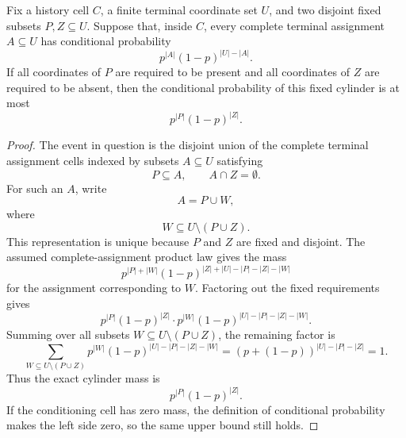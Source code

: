 \begin{helper}
Fix a history cell \(C\), a finite terminal coordinate set \(U\), and two
disjoint fixed subsets \(P,Z\subseteq U\).  Suppose that, inside \(C\), every
complete terminal assignment \(A\subseteq U\) has conditional probability
\[
p^{|A|}(1-p)^{|U|-|A|}.
\]
If all coordinates of \(P\) are required to be present and all coordinates of
\(Z\) are required to be absent, then the conditional probability of this
fixed cylinder is at most
\[
p^{|P|}(1-p)^{|Z|}.
\]
\end{helper}
\begin{proof}
The event in question is the disjoint union of the complete terminal
assignment cells indexed by subsets \(A\subseteq U\) satisfying
\[
P\subseteq A,\qquad A\cap Z=\emptyset.
\]
For such an \(A\), write
\[
A=P\cup W,
\]
where
\[
W\subseteq U\setminus(P\cup Z).
\]
This representation is unique because \(P\) and \(Z\) are fixed and
disjoint.  The assumed complete-assignment product law gives the mass
\[
p^{|P|+|W|}(1-p)^{|Z|+|U|-|P|-|Z|-|W|}
\]
for the assignment corresponding to \(W\).  Factoring out the fixed
requirements gives
\[
p^{|P|}(1-p)^{|Z|}
\cdot
p^{|W|}(1-p)^{|U|-|P|-|Z|-|W|}.
\]
Summing over all subsets \(W\subseteq U\setminus(P\cup Z)\), the remaining
factor is
\[
\sum_{W\subseteq U\setminus(P\cup Z)}
p^{|W|}(1-p)^{|U|-|P|-|Z|-|W|}
=(p+(1-p))^{|U|-|P|-|Z|}=1.
\]
Thus the exact cylinder mass is
\[
p^{|P|}(1-p)^{|Z|}.
\]
If the conditioning cell has zero mass, the definition of conditional
probability makes the left side zero, so the same upper bound still holds.
\end{proof}
